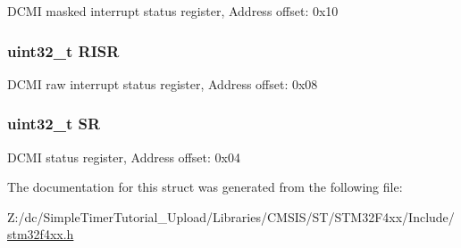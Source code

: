 D\-C\-M\-I masked interrupt status register, Address offset\-: 0x10 \hypertarget{struct_d_c_m_i___type_def_aa196fddf0ba7d6e3ce29bdb04eb38b94}{
\subsubsection[{R\-I\-S\-R}]{ uint32\-\_\-t R\-I\-S\-R}}\label{struct_d_c_m_i___type_def_aa196fddf0ba7d6e3ce29bdb04eb38b94}
D\-C\-M\-I raw interrupt status register, Address offset\-: 0x08 \hypertarget{struct_d_c_m_i___type_def_af6aca2bbd40c0fb6df7c3aebe224a360}{
\subsubsection[{S\-R}]{ uint32\-\_\-t S\-R}}\label{struct_d_c_m_i___type_def_af6aca2bbd40c0fb6df7c3aebe224a360}
D\-C\-M\-I status register, Address offset\-: 0x04 

The documentation for this struct was generated from the following file\-:\begin{DoxyCompactItemize}
\item 
Z\-:/dc/\-Simple\-Timer\-Tutorial\-\_\-\-Upload/\-Libraries/\-C\-M\-S\-I\-S/\-S\-T/\-S\-T\-M32\-F4xx/\-Include/\hyperlink{stm32f4xx_8h}{stm32f4xx.\-h}\end{DoxyCompactItemize}
